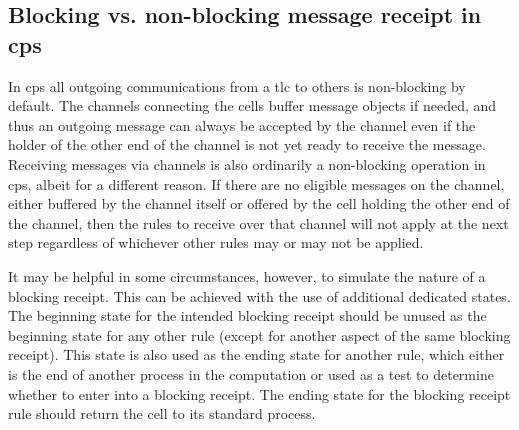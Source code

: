   
  

\subsection{\label{sec:nmp:blocking}Blocking vs. non-blocking message receipt in \texorpdfstring{\gls{cps}}{cP systems}}
In \gls{cps} all outgoing communications from a \gls{tlc} to others is non-blocking by default.  The channels connecting the cells buffer message objects if needed, and thus an outgoing message can always be accepted by the channel even if the holder of the other end of the channel is not yet ready to receive the message.  Receiving messages via channels is also ordinarily a non-blocking operation in \gls{cps}, albeit for a different reason.  If there are no eligible messages on the channel, either buffered by the channel itself or offered by the cell holding the other end of the channel, then the rules to receive over that channel will not apply at the next step regardless of whichever other rules may or may not be applied.

It may be helpful in some circumstances, however, to simulate the nature of a blocking receipt.  This can be achieved with the use of additional dedicated states.  The beginning state for the intended blocking receipt should be unused as the beginning state for any other rule (except for another aspect of the same blocking receipt).  This state is also used as the ending state for another rule, which either is the end of another process in the computation or used as a test to determine whether to enter into a blocking receipt.  The ending state for the blocking receipt rule should return the cell to its standard process.

